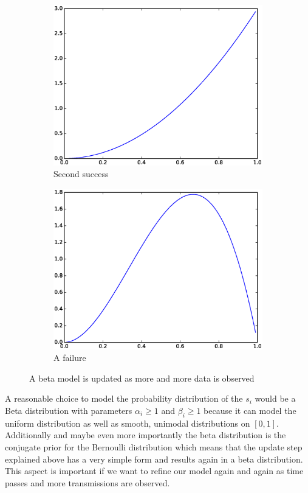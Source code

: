 \documentclass[10pt,a4paper]{article}
\begin{document}
\begin{figure}[h]
\begin{subfigure}[b]{0.23\textwidth}
		\includegraphics[width=\textwidth]{model/beta-learning-3-1}
		\caption{Second success}
	\end{subfigure}
  \begin{subfigure}[b]{0.23\textwidth}
		\includegraphics[width=\textwidth]{model/beta-learning-3-2}
		\caption{A failure}
	\end{subfigure}
  \caption{A beta model is updated as more and more data is observed}
  \label{fig:model:beta-learning}
\end{figure}

A reasonable choice to model the probability distribution of the $s_{i}$ would be a Beta distribution with parameters $\alpha_{i} \ge 1$ and $\beta_{i} \ge 1$ because it can model the uniform distribution as well as smooth, unimodal distributions on $[0, 1]$.
Additionally and maybe even more importantly the beta distribution is the conjugate prior for the Bernoulli distribution which means that the update step explained above has a very simple form and results again in a beta distribution.
This aspect is important if we want to refine our model again and again as time passes and more transmissions are observed.
\end{document}
